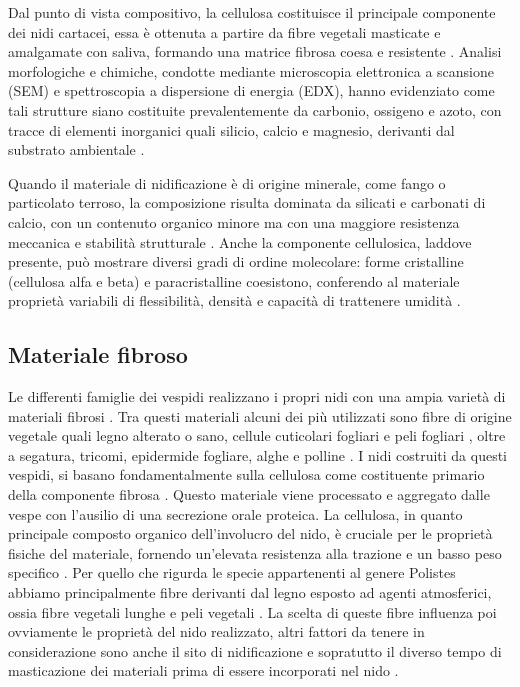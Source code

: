 Dal punto di vista compositivo, la cellulosa costituisce il principale componente dei nidi cartacei, essa è ottenuta a partire da fibre vegetali masticate e amalgamate con saliva, formando una matrice fibrosa coesa e resistente \cite{Singer1992}.
Analisi morfologiche e chimiche, condotte mediante microscopia elettronica a scansione (SEM) e spettroscopia a dispersione di energia (EDX), hanno evidenziato come tali strutture siano costituite prevalentemente da carbonio, ossigeno e azoto, con tracce di elementi inorganici quali silicio, calcio e magnesio, derivanti dal substrato ambientale \cite{Bağriaçik}. 

Quando il materiale di nidificazione è di origine minerale, come fango o particolato terroso, la composizione risulta dominata da silicati e carbonati di calcio, con un contenuto organico minore ma con una maggiore resistenza meccanica e stabilità strutturale \cite{Khan}. 
Anche la componente cellulosica, laddove presente, può mostrare diversi gradi di ordine molecolare: forme cristalline (cellulosa alfa e beta) e paracristalline coesistono, conferendo al materiale proprietà variabili di flessibilità, densità e capacità di trattenere umidità \cite{LARSSON199719}.

\subsection{Materiale fibroso}
Le differenti famiglie dei vespidi realizzano i propri nidi con una ampia varietà di materiali fibrosi \cite{Borges}.
Tra questi materiali alcuni dei più utilizzati sono fibre di origine vegetale quali legno alterato o sano, cellule cuticolari fogliari e peli fogliari \cite{Cole2001}, oltre a segatura, tricomi, epidermide fogliare, alghe e polline \cite{Borges}. 
I nidi costruiti da questi vespidi, si basano fondamentalmente sulla cellulosa come costituente primario della componente fibrosa \cite{Curtis}.
Questo materiale viene processato e aggregato dalle vespe con l'ausilio di una secrezione orale proteica\cite{Singer1992}.
La cellulosa, in quanto principale composto organico dell'involucro del nido, è cruciale per le proprietà fisiche del materiale, fornendo un'elevata resistenza alla trazione e un basso peso specifico \cite{Schmolz}.
Per quello che rigurda le specie appartenenti al genere Polistes abbiamo principalmente fibre derivanti dal legno esposto ad agenti atmosferici, ossia fibre vegetali lunghe e peli vegetali \cite{Bagriacik2013}.
La scelta di queste fibre influenza poi ovviamente le proprietà del nido realizzato, altri fattori da tenere in considerazione sono anche il sito di nidificazione e sopratutto il diverso tempo di masticazione dei materiali prima di essere incorporati nel nido \cite{Bagriacik2013}.

